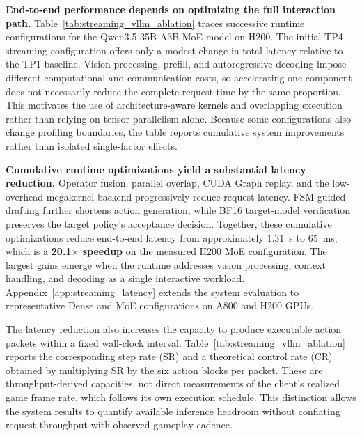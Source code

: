 \textbf{End-to-end performance depends on optimizing the full interaction path.}
Table~\ref{tab:streaming_vllm_ablation} traces successive runtime configurations for the Qwen3.5-35B-A3B MoE model on H200. The initial TP4 streaming configuration offers only a modest change in total latency relative to the TP1 baseline. Vision processing, prefill, and autoregressive decoding impose different computational and communication costs, so accelerating one component does not necessarily reduce the complete request time by the same proportion. This motivates the use of architecture-aware kernels and overlapping execution rather than relying on tensor parallelism alone. Because some configurations also change profiling boundaries, the table reports cumulative system improvements rather than isolated single-factor effects.

\textbf{Cumulative runtime optimizations yield a substantial latency reduction.}
Operator fusion, parallel overlap, CUDA Graph replay, and the low-overhead megakernel backend progressively reduce request latency. FSM-guided drafting further shortens action generation, while BF16 target-model verification preserves the target policy's acceptance decision. Together, these cumulative optimizations reduce end-to-end latency from approximately 1.31~s to 65~ms, which is a \textbf{20.1$\times$ speedup} on the measured H200 MoE configuration. The largest gains emerge when the runtime addresses vision processing, context handling, and decoding as a single interactive workload. Appendix~\ref{app:streaming_latency} extends the system evaluation to representative Dense and MoE configurations on A800 and H200 GPUs.

The latency reduction also increases the capacity to produce executable action packets within a fixed wall-clock interval. Table~\ref{tab:streaming_vllm_ablation} reports the corresponding step rate (SR) and a theoretical control rate (CR) obtained by multiplying SR by the six action blocks per packet. These are throughput-derived capacities, not direct measurements of the client's realized game frame rate, which follows its own execution schedule. This distinction allows the system results to quantify available inference headroom without conflating request throughput with observed gameplay cadence.

